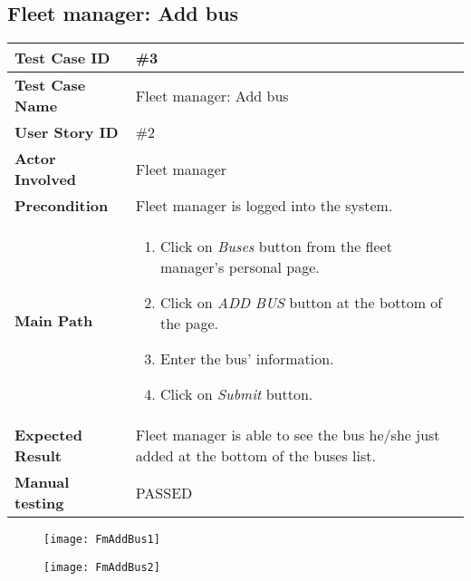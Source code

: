 \subsection{Fleet manager: Add bus}
\begin{center}
	\begin{tabular} { | m{3.5cm} | m{9.5cm} | }
		\hline
		\textbf{Test Case ID} & \#3\\
		\hline
		\textbf{Test Case Name} & Fleet manager: Add bus\\
		\hline
		\textbf{User Story ID} & \#2 \\
		\hline
		\textbf{Actor Involved} & Fleet manager\\
		\hline
		\textbf{Precondition} & Fleet manager is logged into the system.\\
		\hline
		\textbf{Main Path} & 
		\begin{enumerate}
			\item Click on \textit{Buses} button from the fleet manager's personal page.
			\item Click on \textit{ADD BUS} button at the bottom of the page.
			\item Enter the bus' information.
			\item Click on \textit{Submit} button.
		\end{enumerate}\\
		\hline
		\textbf{Expected Result} & Fleet manager is able to see the bus he/she just added at the bottom of the buses list.\\
		\hline
		\textbf{Manual testing} & PASSED\\
		\hline
	\end{tabular}
\end{center}
\begin{figure}[H]
\centering
\texttt{[image: FmAddBus1]}
\end{figure}
\begin{figure}[H]
\centering
\texttt{[image: FmAddBus2]}
\end{figure}
\newpage
